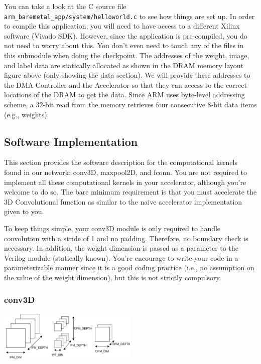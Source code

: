 \documentclass[11pt]{article}
\begin{document}
You can take a look at the C source file \verb|arm_baremetal_app/system/helloworld.c| to see how things are set up. In order to compile this application, you will need to have access to a different Xilinx software (Vivado SDK). However, since the application is pre-compiled, you do not need to worry about this. You don't even need to touch any of the files in this submodule when doing the checkpoint. The addresses of the weight, image, and label data are statically allocated as shown in the DRAM memory layout figure above (only showing the data section). We will provide these addresses to the DMA Controller and the Accelerator so that they can access to the correct locations of the DRAM to get the data. Since ARM uses byte-level addressing scheme, a 32-bit read from the memory retrieves four consecutive 8-bit data items (e.g., weights).

\subsection{Software Implementation}

This section provides the software description for the computational kernels found in our network: conv3D, maxpool2D, and fconn. You are not required to implement all these computational kernels in your accelerator, although you're welcome to do so. The bare minimum requirement is that you must accelerate the 3D Convolutional function as similar to the naive accelerator implementation given to you.

To keep things simple, your conv3D module is only required to handle convolution with a stride of 1 and no padding. Therefore, no boundary check is necessary. In addition, the weight dimension is passed as a parameter to the Verilog module (statically known). You're encourage to write your code in a parameterizable manner since it is a good coding practice (i.e., no assumption on the value of the weight dimension), but this is not strictly compulsory.

\subsubsection{conv3D}

\begin{center}
\includegraphics[width=0.5\textwidth]{images/conv3D.png}
\end{center}
\end{document}
